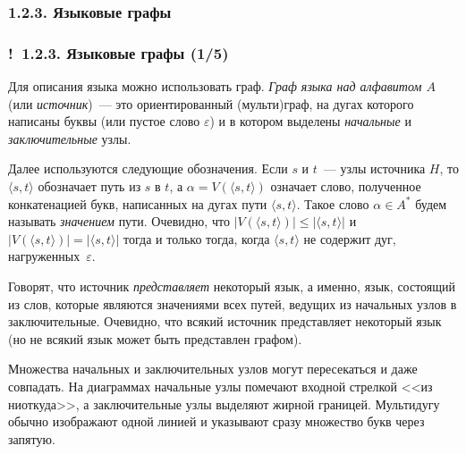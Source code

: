 \documentclass[mathserif,12pt,aspectratio=169]{beamer}
\def\emразделенной{\em разделенной}
\renewcommand{\index}[1]{}
\def\em#1{\it\color{blue}#1}
\def\odmkey#1#2{{\it\color{red} #1}\index{#2}}
\let\leq\leqslant
\def\Ok{{\color{green}\textbf{!}\ }}
\begin{document}
\subsubsection{1.2.3. Языковые графы }
\label{1.2.3.}
\begin{frame}
\frametitle{\Ok 1.2.3. Языковые графы (1/5)}
Для описания языка можно использовать граф. 
\odmkey{Граф языка над
алфавитом $A$}{Граф!языка} (или \odmkey{источник}{Источник})~---
это ориентированный (мульти)граф, на дугах которого написаны буквы (или пустое слово
$\varepsilon$) и в котором выделены
\odmkey{начальные}{Узел!начальный} и
\odmkey{заключительные}{Узел!заключительный} узлы.

\smallskip
Далее
используются следующие обозначения. Если $s$ и $t$~--- узлы
источника $H$, то $\langle s, t\rangle$ обозначает путь из $s$ в
$t$, а $\alpha= V(\langle s, t\rangle)$ означает слово, полученное
конкатенацией букв, написанных на дугах пути $\langle s,
t\rangle$. Такое слово $\alpha \in A^*$ будем называть
\odmkey{значением}{Значение!пути} пути. Очевидно, что $|V(\langle
s, t \rangle)|\leq |\langle s, t\rangle|$  и $|V(\langle s, t
\rangle)| = |\langle s, t \rangle|$ тогда и только тогда, когда
$\langle s, t \rangle$  не содержит дуг, нагруженных~$\varepsilon$.

\smallskip
Говорят, что источник {\em представляет} некоторый язык, а именно,
язык, состоящий из слов, которые являются значениями всех путей,
ведущих из начальных узлов в заключительные.
Очевидно, что всякий источник представляет некоторый язык (но не
всякий язык может быть представлен графом).

\begin{remark}
Множества начальных и заключительных узлов могут пересекаться и
даже совпадать. На диаграммах начальные узлы помечают входной стрелкой
<<из ниоткуда>>, а заключительные узлы выделяют жирной границей. Мультидугу обычно изображают одной линией и указывают
сразу множество букв через запятую.
\end{remark}
\end{frame}
\end{document}

